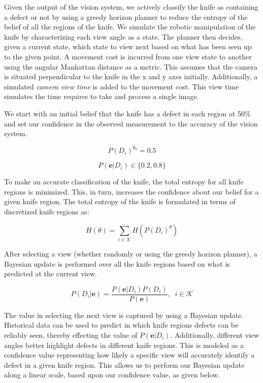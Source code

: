 \documentclass[letterpaper, 10 pt, conference]{ieeeconf}  %
\begin{document}
Given the output of the vision system, we actively classify the knife as containing a defect or not by using a greedy horizon planner to reduce the entropy of the belief of all the regions of the knife. We simulate the robotic manipulation of the knife by characterizing each view angle as a state. The planner then decides, given a current state, which state to view next based on what has been seen up to the given point. A movement cost is incurred from one view state to another using the angular Manhattan distance as a metric. This assumes that the camera is situated perpendicular to the knife in the x and y axes initially. Additionally, a simulated \textit{camera view time} is added to the movement cost. This view time simulates the time requires to take and process a single image.

We start with an initial belief that the knife has a defect in each region at 50\% and set our confidence in the observed measurement to the accuracy of the vision system.

\begin{equation*}
    P(D_i)^{\theta_0} = 0.5 \label{eq: initDist}
\end{equation*}

\begin{equation*}
    P(\mathbf{e}|D_i) \in \{0.2,0.8\} \label{eq:initVisionAccuracy}
\end{equation*}

To make an accurate classification of the knife, the total entropy for all knife regions is minimized. This, in turn, increases the confidence about our belief for a given knife region. The total entropy of the knife is formulated in terms of discretized knife regions as:

\begin{equation}
    H(\theta) = \sum_{i\in\mathcal{K}} H(P(D_i)^\theta) \label{eq: totalKnifeEntropyDist}
\end{equation}


After selecting a view (whether randomly or using the greedy horizon planner), a Bayesian update is performed over all the knife regions based on what is predicted at the current view.

\begin{equation}
    P(D_i|\mathbf{e}) = \frac{P(\mathbf{e}|D_i) P(D_i)}{P(\mathbf{e})}, \;\;i\in \mathcal{K}  \label{eq: bayesianUpdate}
\end{equation}

The value in selecting the next view is captured by using a Bayesian update. Historical data can be used to predict in which knife regions defects can be reliably seen, thereby effecting the value of $P(\mathbf{e}|D_i)$. Additionally, different view angles better highlight defects in different knife regions. This is modeled as a confidence value representing how likely a specific view will accurately identify a defect in a given knife region. This allows us to perform our Bayesian update along a linear scale, based upon our confidence value, as given below.
\end{document}
